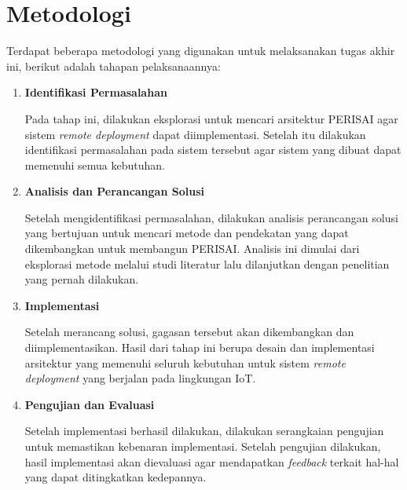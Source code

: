 \section{Metodologi}

Terdapat beberapa metodologi yang digunakan untuk melaksanakan tugas akhir ini, berikut adalah tahapan pelaksanaannya:
\begin{enumerate}
  \item \textbf{Identifikasi Permasalahan}

        Pada tahap ini, dilakukan eksplorasi untuk mencari arsitektur PERISAI agar sistem \textit{remote deployment} dapat diimplementasi. Setelah itu dilakukan identifikasi permasalahan pada sistem tersebut agar sistem yang dibuat dapat memenuhi semua kebutuhan.

  \item \textbf{Analisis dan Perancangan Solusi}

        Setelah mengidentifikasi permasalahan, dilakukan analisis perancangan solusi yang bertujuan untuk mencari metode dan pendekatan yang dapat dikembangkan untuk membangun PERISAI. Analisis ini dimulai dari eksplorasi metode melalui studi literatur lalu dilanjutkan dengan penelitian yang pernah dilakukan.

  \item \textbf{Implementasi}

        Setelah merancang solusi, gagasan tersebut akan dikembangkan dan diimplementasikan. Hasil dari tahap ini berupa desain dan implementasi arsitektur yang memenuhi seluruh kebutuhan untuk sistem \textit{remote deployment} yang berjalan pada lingkungan IoT.

  \item \textbf{Pengujian dan Evaluasi}

        Setelah implementasi berhasil dilakukan, dilakukan serangkaian pengujian untuk memastikan kebenaran implementasi. Setelah pengujian dilakukan, hasil implementasi akan dievaluasi agar mendapatkan \textit{feedback} terkait hal-hal yang dapat ditingkatkan kedepannya.

\end{enumerate}